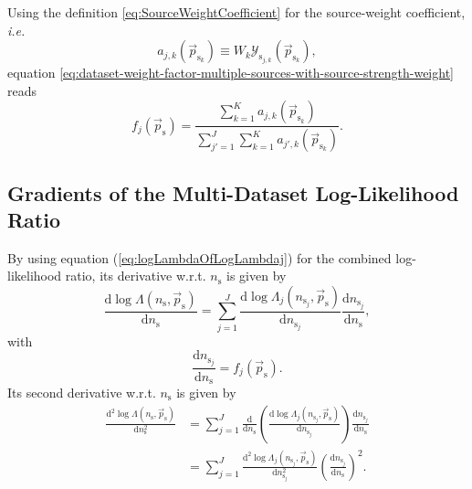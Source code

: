 \documentclass{article}
\newcommand{\ns}{n_{\mathrm{s}}}
\newcommand{\ps}{\vec{p}_{\mathrm{s}}}
\newcommand{\psk}{\vec{p}_{\mathrm{s}_k}}
\begin{document}
Using the definition \ref{eq:SourceWeightCoefficient} for the source-weight
coefficient, \emph{i.e.}
\begin{equation}
a_{j,k}(\psk) \equiv W_k \mathcal{Y}_{\mathrm{s}_{j,k}}(\psk),
\end{equation}
equation
\ref{eq:dataset-weight-factor-multiple-sources-with-source-strength-weight}
reads
\begin{equation}
 f_{j}(\ps) = \frac{\sum_{k=1}^{K} a_{j,k}(\psk)}
                   {\sum_{j'=1}^{J} \sum_{k=1}^{K} a_{j',k}(\psk)}.
 \label{eq:dataset-weight-factor-multi-sources-with-source-weight-coefficient}
\end{equation}

\subsection{Gradients of the Multi-Dataset Log-Likelihood Ratio}

By using equation (\ref{eq:logLambdaOfLogLambdaj}) for the combined log-likelihood
ratio, its derivative w.r.t. $\ns$ is given by
\begin{equation}
 \frac{\mathrm{d}\log\Lambda(\ns,\ps)}{\mathrm{d}\ns} = \sum_{j=1}^{J} \frac{\mathrm{d}\log\Lambda_j(n_{\mathrm{s}_j},\ps)}{\mathrm{d}n_{\mathrm{s}_j}} \frac{\mathrm{d} n_{\mathrm{s}_j}}{\mathrm{d} \ns},
\end{equation}
with
\begin{equation}
\frac{\mathrm{d} n_{\mathrm{s}_j}}{\mathrm{d} \ns} = f_j(\ps).
\end{equation}
Its second derivative w.r.t. $\ns$ is given by
\begin{align}
 \frac{\mathrm{d}^2\log\Lambda(\ns,\ps)}{\mathrm{d}\ns^2} &= \sum_{j=1}^{J} \frac{\mathrm{d}}{\mathrm{d}\ns}\left( \frac{\mathrm{d}\log\Lambda_j(n_{\mathrm{s}_j},\ps)}{\mathrm{d}n_{\mathrm{s}_j}} \right) \frac{\mathrm{d} n_{\mathrm{s}_j}}{\mathrm{d} \ns}\\
&= \sum_{j=1}^{J} \frac{\mathrm{d}^2\log\Lambda_j(n_{\mathrm{s}_j},\ps)}{\mathrm{d}n_{\mathrm{s}_j}^2} \left( \frac{\mathrm{d} n_{\mathrm{s}_j}}{\mathrm{d} \ns} \right)^2.
\end{align}
\end{document}
